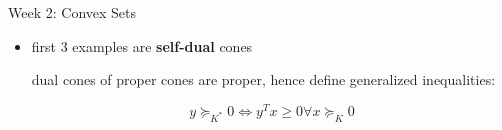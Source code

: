 \documentclass{article}
\begin{document}
\begin{homeworkProblemName}{{\LARGE Week 2: Convex Sets}}
\begin{problemAnswer}
{\begin{itemize}
        $$ K^* = \{y | y^Tx \geq 0 \forall x \in K\} $$

        Things that make a non-negative inner-product with K. K$^{**}$ == K.

        \begin{itemize}
        \item K = $\bm{R}_+^n: K^* = \bm{R}_+^n$

          If you draw it out, you find that you get something that is 90$^{\circ}$

          Vector is nonnegative IFF forms nonnegative inner product with all
          nonnegative vectors

        \item K = $\bm{S}_+^n: K^* = \bm{S}_+^n$

          Basically saying that given some symmetric matrices,  X, Y,

          $$ trace(X, Y) = \sum_{i, j} X_{ij} Y_{ij} == vec(X)^Tvec(Y)$$

          Matrix is PSD IFF its trace against all PSD matrices is nonnegative

        \item K = $\{(x, y) | ||x||_2 \leq t\}: K^* = \{(x, y) | ||x||_2 \leq t\}$


        \item K = $\{(x, y) | ||x||_1 \leq t\}: K^* = \{(x, y) | ||x||_{\infty} \leq t\}$
        \end{itemize}

        \item first 3 examples are \textbf{self-dual} cones

          dual cones of proper cones are proper, hence define generalized
          inequalities:

          $$ y \succeq_{K^*} 0 \iff y^Tx \geq 0 \forall x \succeq_K 0 $$
      \end{itemize}
    }\end{problemAnswer}

\end{homeworkProblemName}
\end{document}
